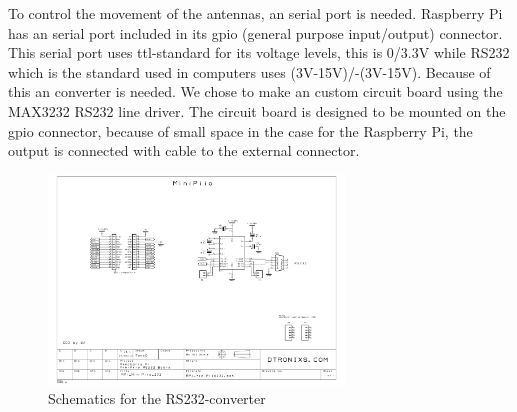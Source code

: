 To control the movement of the antennas, an serial port is needed. Raspberry Pi has an serial port included in its gpio (general purpose input/output) connector. This serial port uses ttl-standard for its voltage levels, this is 0/3.3V while RS232 which is the standard used in computers uses (3V-15V)/-(3V-15V). Because of this an converter is needed. We chose to make an custom circuit board using the MAX3232 RS232 line driver. The circuit board is designed to be mounted on the gpio connector, because of small space in the case for the Raspberry Pi, the output is connected with cable to the external connector.

\begin{figure}
	\begin{center}
		\includegraphics[width=0.7\textwidth, trim=400 250 100 100, clip=true]{../Schematics/UART-to-RS232.pdf}
	\end{center}
	\caption{Schematics for the RS232-converter}
	\label{fig:UART-RS232}
\end{figure}